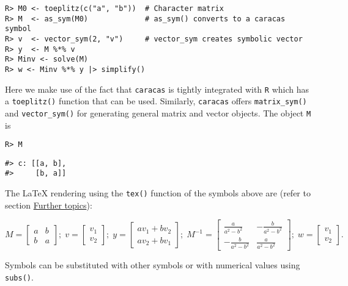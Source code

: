 \begin{verbatim}
R> M0 <- toeplitz(c("a", "b"))  # Character matrix
R> M  <- as_sym(M0)             # as_sym() converts to a caracas symbol
R> v  <- vector_sym(2, "v")     # vector_sym creates symbolic vector
R> y  <- M %*% v
R> Minv <- solve(M) 
R> w <- Minv %*% y |> simplify()
\end{verbatim}

Here we make use of the fact that \texttt{caracas} is tightly integrated with \texttt{R}
which has a \texttt{toeplitz()} function that can be used.
Similarly, \texttt{caracas} offers \texttt{matrix\_sym()} and
\texttt{vector\_sym()} for generating general matrix and vector objects.
The object \texttt{M} is

\begin{verbatim}
R> M
\end{verbatim}

\begin{verbatim}
#> c: [[a, b],
#>     [b, a]]
\end{verbatim}

The LaTeX rendering using the \texttt{tex()} function of the symbols
above are (refer to section \protect\hyperlink{further-topics}{Further topics}):

\begin{equation}
M = \left[\begin{matrix}a & b\\b & a\end{matrix}\right]; \; 
v = \left[\begin{matrix}v_{1}\\v_{2}\end{matrix}\right]; \;
y = \left[\begin{matrix}a v_{1} + b v_{2}\\a v_{2} + b v_{1}\end{matrix}\right]; \;
M^{-1} = \left[\begin{matrix}\frac{a}{a^{2} - b^{2}} & - \frac{b}{a^{2} - b^{2}}\\- \frac{b}{a^{2} - b^{2}} & \frac{a}{a^{2} - b^{2}}\end{matrix}\right]; \;
w = \left[\begin{matrix}v_{1}\\v_{2}\end{matrix}\right] . 
\end{equation}

Symbols can be substituted with other symbols or with numerical values
using \texttt{subs()}.

